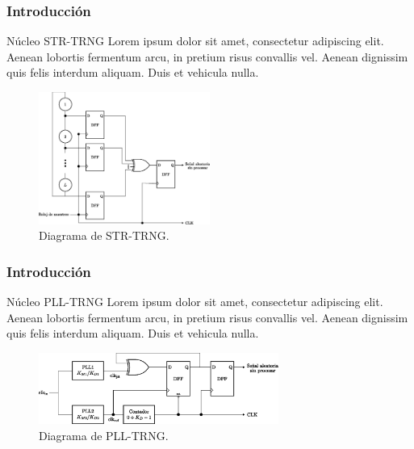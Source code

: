 \documentclass[10pt]{beamer}
\begin{document}
\begin{frame}
    \frametitle{Introducción}
    \begin{block}{Núcleo STR-TRNG}
        \justifying
         Lorem ipsum dolor sit amet, consectetur adipiscing elit. Aenean lobortis fermentum arcu, in pretium risus convallis vel. Aenean dignissim quis felis interdum aliquam. Duis et vehicula nulla.   
	\end{block}
	\begin{figure}[hbtp]
	    \centering
	    \includegraphics[width=0.5\textwidth]{A5_STR_TRNG}
	    \caption{Diagrama de STR-TRNG.}
        \label{fig:A5_STR_TRNG}
    \end{figure}
\end{frame}


\begin{frame}
    \frametitle{Introducción}
    \begin{block}{Núcleo PLL-TRNG}
        \justifying
         Lorem ipsum dolor sit amet, consectetur adipiscing elit. Aenean lobortis fermentum arcu, in pretium risus convallis vel. Aenean dignissim quis felis interdum aliquam. Duis et vehicula nulla.   
	\end{block}
	\begin{figure}[hbtp]
	    \centering
	    \includegraphics[width=0.7\textwidth]{A6_PLL_TRNG}
	    \caption{Diagrama de PLL-TRNG.}
        \label{fig:A6_PLL_TRNG}
    \end{figure}
\end{frame}
\end{document}

